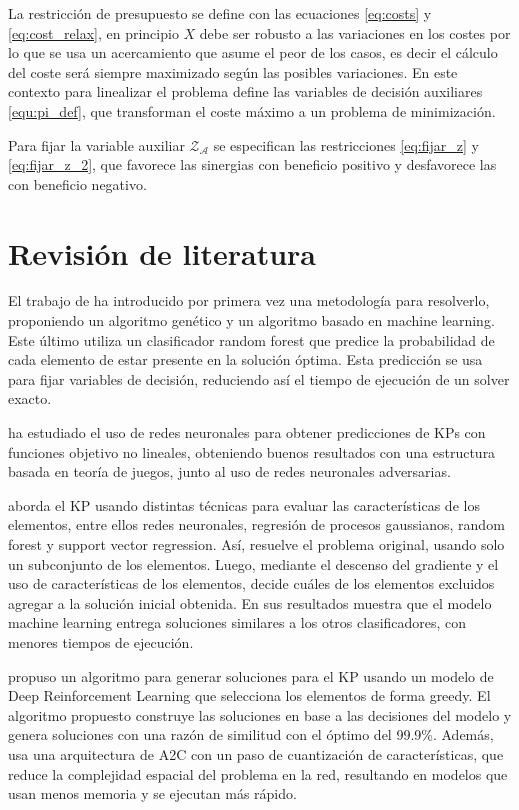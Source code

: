 \documentclass[spanish, a4paper, 12pt, openany,final]{book}
\begin{document}
    La restricción de presupuesto se define con las ecuaciones \ref{eq:costs} y \ref{eq:cost_relax}, en principio $X$ debe ser robusto a las variaciones en los costes por lo que se usa un acercamiento que asume el peor de los casos, es decir el cálculo del coste será siempre maximizado según las posibles variaciones. En este contexto para linealizar el problema \cite{baldo_polynomial_2023} define las variables de decisión auxiliares \ref{equ:pi_def}, que transforman el coste máximo a un problema de minimización.
    
    Para fijar la variable auxiliar $\mathcal{Z_A}$ se especifican las restricciones \ref{eq:fijar_z} y \ref{eq:fijar_z_2}, que favorece las sinergias con beneficio positivo y desfavorece las con beneficio negativo.
  
\section{Revisión de literatura}


El trabajo de \cite{baldo_polynomial_2023} ha introducido por primera vez una metodología para resolverlo, proponiendo un algoritmo genético y un algoritmo basado en machine learning. Este último utiliza un clasificador random forest que predice la probabilidad de cada elemento de estar presente en la solución óptima. Esta predicción se usa para fijar variables de decisión, reduciendo así el tiempo de ejecución de un solver exacto.

\cite{li_novel_2021} ha estudiado el uso de redes neuronales para obtener predicciones de KPs con funciones objetivo no lineales, obteniendo buenos resultados con una estructura basada en teoría de juegos, junto al uso de redes neuronales adversarias.

\cite{rezoug_application_2022} aborda el KP usando distintas técnicas para evaluar las características de los elementos, entre ellos redes neuronales, regresión de procesos gaussianos, random forest y support vector regression. Así, resuelve el problema original, usando solo un subconjunto de los elementos. Luego, mediante el descenso del gradiente y el uso de características de los elementos, decide cuáles de los elementos excluidos agregar a la solución inicial obtenida. En sus resultados muestra que el modelo machine learning entrega soluciones similares a los otros clasificadores, con menores tiempos de ejecución.

\cite{afshar_state_2020} propuso un algoritmo para generar soluciones para el KP usando un modelo de Deep Reinforcement Learning que selecciona los elementos de forma greedy. El algoritmo propuesto construye las soluciones en base a las decisiones del modelo y genera soluciones con una razón de similitud con el óptimo del 99.9\%. Además, usa una arquitectura de A2C con un paso de cuantización de características, que reduce la complejidad espacial del problema en la red, resultando en modelos que usan menos memoria y se ejecutan más rápido.
\end{document}
